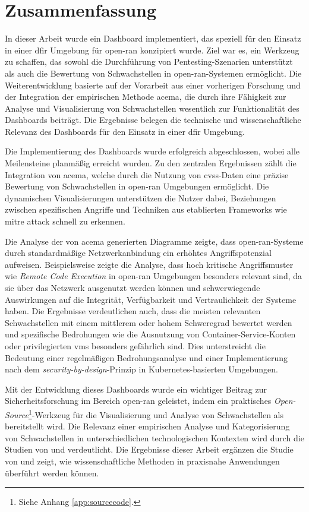 \chapter{Zusammenfassung}
\label{chap:zusammenfassung}
In dieser Arbeit wurde ein Dashboard implementiert, das speziell für den Einsatz in einer \gls{dfir} Umgebung für \gls{open-ran} konzipiert wurde. Ziel war es, ein Werkzeug zu schaffen, das sowohl die Durchführung von Pentesting-Szenarien unterstützt als auch die Bewertung von Schwachstellen in \gls{open-ran}-Systemen ermöglicht. Die Weiterentwicklung basierte auf der Vorarbeit aus einer vorherigen Forschung und der Integration der empirischen Methode \gls{acema}, die durch ihre Fähigkeit zur Analyse und Visualisierung von Schwachstellen wesentlich zur Funktionalität des Dashboards beiträgt. Die Ergebnisse belegen die technische und wissenschaftliche Relevanz des Dashboards für den Einsatz in einer \gls{dfir} Umgebung.

Die Implementierung des Dashboards wurde erfolgreich abgeschlossen, wobei alle Meilensteine planmäßig erreicht wurden. Zu den zentralen Ergebnissen zählt die Integration von \gls{acema}, welche durch die Nutzung von \gls{cvss}-Daten eine präzise Bewertung von Schwachstellen in \gls{open-ran} Umgebungen ermöglicht. Die dynamischen Visualisierungen unterstützen die Nutzer dabei, Beziehungen zwischen spezifischen Angriffe und Techniken aus etablierten Frameworks wie \gls{mitre} \gls{attack} schnell zu erkennen.

Die Analyse der von \gls{acema} generierten Diagramme zeigte, dass \gls{open-ran}-Systeme durch standardmäßige Netzwerkanbindung ein erhöhtes Angriffspotenzial aufweisen. Beispielsweise zeigte die Analyse, dass hoch kritische Angriffsmuster wie \textit{Remote Code Execution} in \gls{open-ran} Umgebungen besonders relevant sind, da sie über das Netzwerk ausgenutzt werden können und schwerwiegende Auswirkungen auf die Integrität, Verfügbarkeit und Vertraulichkeit der Systeme haben. Die Ergebnisse verdeutlichen auch, dass die meisten relevanten Schwachstellen mit einem mittlerem oder hohem Schweregrad bewertet werden und spezifische Bedrohungen wie die Ausnutzung von Container-Service-Konten oder privilegierten \glspl{vm} besonders gefährlich sind. Dies unterstreicht die Bedeutung einer regelmäßigen Bedrohungsanalyse und einer Implementierung nach dem \textit{security-by-design}-Prinzip in Kubernetes-basierten Umgebungen.

Mit der Entwicklung dieses Dashboards wurde ein wichtiger Beitrag zur Sicherheitsforschung im Bereich \gls{open-ran} geleistet, indem ein praktisches \textit{Open-Source}\footnote{Siehe Anhang \ref{app:sourcecode}.}-Werkzeug für die Visualisierung und Analyse von Schwachstellen als bereitstellt wird. Die Relevanz einer empirischen Analyse und Kategorisierung von Schwachstellen in unterschiedlichen technologischen Kontexten wird durch die Studien von \autocite{mazuera-rozoAndroidOSStack2019} und \autocite{klementSecuring6GTransition2024} verdeutlicht. Die Ergebnisse dieser Arbeit ergänzen die Studie von \citeauthor{klementSecuring6GTransition2024} und zeigt, wie wissenschaftliche Methoden in praxisnahe Anwendungen überführt werden können.

